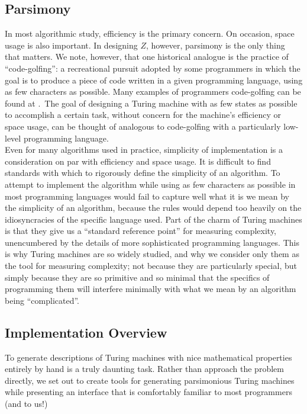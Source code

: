 \documentclass[11pt]{article}
\begin{document}
\subsection{Parsimony}

In most algorithmic study, efficiency is the primary concern. On occasion, space usage is also important. In designing $Z$, however, parsimony is the only thing that matters. We note, however, that one historical analogue is the practice of ``code-golfing'': a recreational pursuit adopted by some programmers in which the goal is to produce a piece of code written in a given programming language, using as few characters as possible. Many examples of programmers code-golfing can be found at \cite{codegolf}.~The goal of designing a Turing machine with as few states as possible to accomplish a certain task, without concern for the machine's efficiency or space usage, can be thought of analogous to code-golfing with a particularly low-level programming language. \\

Even for many algorithms used in practice, simplicity of implementation is a consideration on par with efficiency and space usage. It is difficult to find standards with which to rigorously define the simplicity of an algorithm. To attempt to implement the algorithm while using as few characters as possible in most programming languages would fail to capture well what it is we mean by the simplicity of an algorithm, because the rules would depend too heavily on the idiosyncracies of the specific language used. Part of the charm of Turing machines is that they give us a ``standard reference point'' for measuring complexity, unencumbered by the details of more sophisticated programming languages. This is why Turing machines are so widely studied, and why we consider only them as the tool for measuring complexity; not because they are particularly special, but simply because they are so primitive and so minimal that the specifics of programming them will interfere minimally with what we mean by an algorithm being ``complicated''.

\subsection{Implementation Overview}

To generate descriptions of Turing machines with nice mathematical properties entirely by hand is a truly daunting task. Rather than approach the problem directly, we set out to create tools for generating parsimonious Turing machines while presenting an interface that is comfortably familiar to most programmers (and to us!) \\
\end{document}
